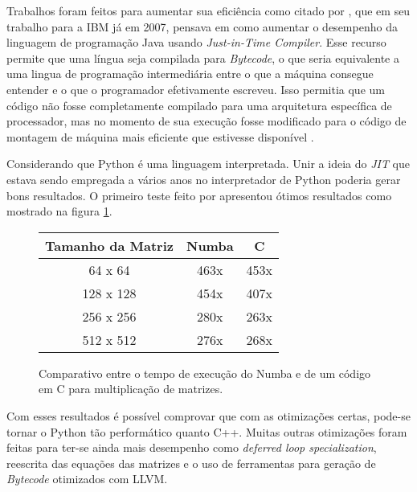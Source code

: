 Trabalhos foram feitos para aumentar sua eficiência como citado por \citeauthor{JIT}, que em seu trabalho
para a IBM já em 2007, pensava em como aumentar o desempenho da linguagem de programação Java usando 
\emph{Just-in-Time Compiler}. Esse recurso permite que uma língua seja compilada para \emph{Bytecode}, o que
seria equivalente a uma lingua de programação intermediária entre o que a máquina consegue entender e o que o 
programador efetivamente escreveu. Isso permitia que um código não fosse completamente compilado para uma arquitetura
específica de processador, mas no momento de sua execução fosse modificado para o código de montagem de máquina
mais eficiente que estivesse disponível \cite{JIT}.

Considerando que Python é uma linguagem interpretada. Unir a ideia do \emph{JIT} que estava sendo empregada a 
vários anos no interpretador de Python poderia gerar bons resultados. O primeiro teste feito por \citeauthor{NumbaLLVMJIT}
apresentou ótimos resultados como mostrado na figura \ref{fig:numbavspythonsequencial}.

\begin{figure}[ht]
    \centering
    \begin{tabular}{|c|c|c|}
        \hline
        Tamanho da Matriz & Numba & C \\
        \hline
        64 x 64 & 463x & 453x \\
        \hline
        128 x 128 & 454x & 407x \\
        \hline 
        256 x 256 & 280x & 263x \\
        \hline
        512 x 512 & 276x & 268x \\
        \hline
    \end{tabular}
    \caption[a]{Comparativo entre o tempo de execução do Numba e de um código em C para multiplicação de matrizes\footnotemark[3].}
    \label{fig:numbavspythonsequencial}
\end{figure}


Com esses resultados é possível comprovar que com as otimizações certas, pode-se tornar o Python tão performático quanto C++.
Muitas outras otimizações foram feitas para ter-se ainda mais desempenho como \emph{deferred loop specialization}, reescrita
das equações das matrizes e o uso de ferramentas para geração de \emph{Bytecode} otimizados com LLVM.

